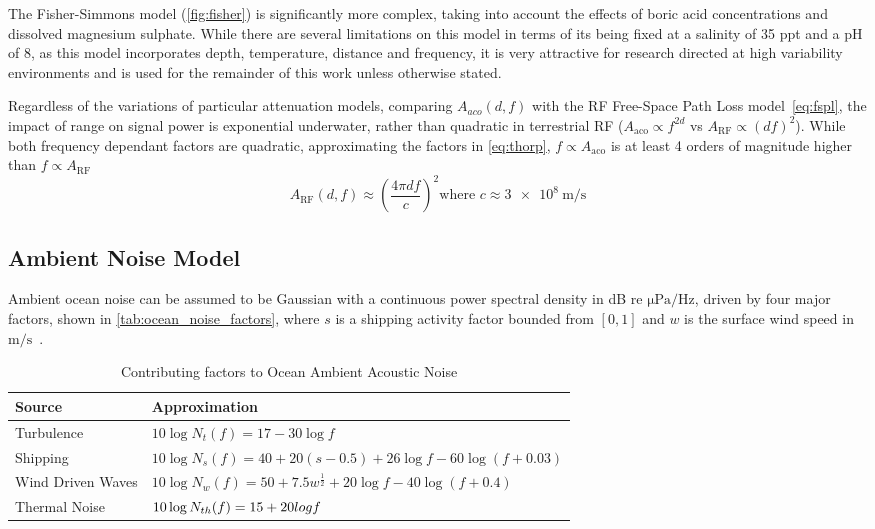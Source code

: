 %
The Fisher-Simmons model (\autoref{fig:fisher}) is significantly more complex, taking into account the effects of boric acid concentrations and dissolved magnesium sulphate. While there are several limitations on this model in terms of its being fixed at a salinity of 35 ppt and a pH of 8, as this model incorporates depth, temperature, distance and frequency, it is very attractive for research directed at high variability environments and is used for the remainder of this work unless otherwise stated.




Regardless of the variations of particular attenuation models, comparing $A_{aco}(d,f)$ with the RF Free-Space Path Loss model~\autoref{eq:fspl}, the impact of range on signal power is exponential underwater, rather than quadratic in terrestrial RF ($A_{\text{aco}} \propto f^{2d}$ vs $A_{\text{RF}} \propto (df)^2$). 
While both frequency dependant factors are quadratic, approximating the factors in \eqref{eq:thorp}, $f\propto A_{\text{aco}}$ is at least 4 orders of magnitude higher than $f\propto A_{\text{RF}}$
\begin{equation}
  \label{eq:fspl}
  A_{\text{RF}}(d,f) \approx \left( \frac{4\pi d f}{c} \right)^2
  \text{where }c\approx \SI{3e8}{\meter\per\second}
\end{equation}


 \subsection{Ambient Noise Model}

 Ambient ocean noise can be assumed to be Gaussian with a continuous power spectral density in dB re $\si{\micro\pascal\per\hertz}$, driven by four major factors, shown in \autoref{tab:ocean_noise_factors}, where $s$ is a shipping activity factor bounded from $[0,1]$ and $w$ is the surface wind speed in $\si{\meter\per\second}$~\cite{coates1989}.

\begin{table}[h]\centering
  \caption{Contributing factors to Ocean Ambient Acoustic Noise}
  \label{tab:ocean_noise_factors}
  \begin{tabularx}{\textwidth}{p{3.5cm} X}\toprule
    Source & Approximation \\ \midrule
    Turbulence & $10 \log N_t(f)=17-30\log f$\\
    Shipping & $10 \log N_s(f) = 40+20(s-0.5)+26\log f-60\log(f+0.03)$\\
    Wind Driven Waves & $10\log N_w(f) = 50+7.5w^{\frac{1}{2}}+20\log f - 40\log(f+0.4)$\\ 
    Thermal Noise & $10\log N_{th}(f) = \-15 + 20 log f$\\\bottomrule
  \end{tabularx}
\end{table}

